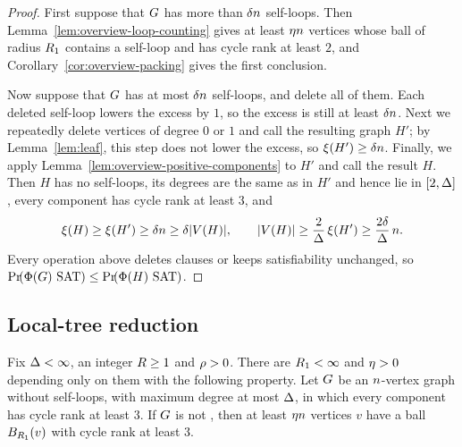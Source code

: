 \begin{proof}
First suppose that \(G\) has more than \(\delta n\) self-loops. Then
Lemma~\ref{lem:overview-loop-counting} gives at least \(\eta n\) vertices
whose ball of radius \(R_1\) contains a self-loop and has cycle rank at least
\(2\), and Corollary~\ref{cor:overview-packing} gives the first conclusion.

Now suppose that \(G\) has at most \(\delta n\) self-loops, and delete all
of them. Each deleted self-loop lowers the excess by \(1\), so the excess is
still at least \(\delta n\). Next we repeatedly delete vertices of degree
\(0\) or \(1\) and call the resulting graph \(H'\); by Lemma~\ref{lem:leaf},
this step does not lower the excess, so \(\xi(H')\ge\delta n\). Finally, we
apply Lemma~\ref{lem:overview-positive-components} to \(H'\) and call the
result \(H\). Then \(H\) has no self-loops, its degrees are the same as in
\(H'\) and hence lie in \([2,\Delta]\), every component has cycle rank at least
\(3\), and
\[
  \xi(H)\ge\xi(H')\ge\delta n\ge\delta|V(H)|,
  \qquad
  |V(H)|\ge\frac{2}{\Delta}\,\xi(H')\ge\frac{2\delta}{\Delta}\,n .
\]
Every operation above deletes clauses or keeps satisfiability unchanged, so
\(\Prx{\rform{\Gin}\SAT}\le\Prx{\rform{H}\SAT}\).
\end{proof}

\subsection{Local-tree reduction}\label{subsec:local-tree-reduction}

\begin{finitecountingrestatement}
Fix \(\Delta<\infty\), an integer \(R\ge1\) and \(\rho>0\). There are
\(R_1<\infty\) and \(\eta>0\) depending only on them with the following
property. Let \(G\) be an \(n\)-vertex graph without self-loops, with
maximum degree at most \(\Delta\), in which every component has cycle rank at
least \(3\). If \(G\) is not \loctree{\rad}{\nontree}, then at least
\(\eta n\) vertices \(v\) have a ball \(B_{R_1}(v)\) with cycle rank
at least \(3\).
\end{finitecountingrestatement}


